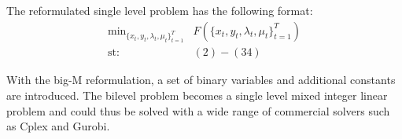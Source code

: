 The reformulated single level problem has the following format:\\
\begin{subequations}
\begin{align}
\text{min}_{\{x_t,y_t, \lambda_t, \mu_t\}^{T}_{t=1}} & F\left(\{x_t,y_t, \lambda_t, \mu_t\}^{T}_{t=1}\right)\nonumber\\
\text{st:   } & (2)-(34)\nonumber
\end{align}
\end{subequations}

With the big-M reformulation, a set of binary variables and additional constants are introduced. The bilevel problem becomes a single level mixed integer linear problem and could thus be solved with a wide range of commercial solvers such as Cplex and Gurobi. 

